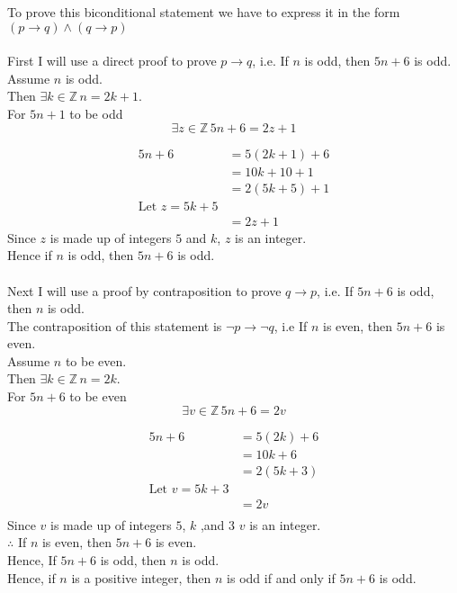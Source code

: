 \documentclass[12pt letter]{report}
\begin{document}
\begin{myproof}
  To prove this biconditional statement we have to express it in the form $\left( p \to q \right) \wedge \left( q \to
    p\right)  $\\
  \\
  First I will use a direct proof to prove $p \to q$, i.e. If $n$ is odd, then $5n + 6$ is odd. \\
  Assume $n$ is odd. \\
  Then $\exists k \in \mathbb{Z} \, n = 2k+ 1$. \\
  For $5n + 1$ to be odd
  \[
    \exists z \in \mathbb{Z} \, 5n + 6 = 2z + 1
  \]

  \begin{align*}
    5n + 6 & = 5 \left( 2k + 1 \right)  + 6 \\
           & = 10k + 10 + 1                 \\
           & = 2 \left( 5k + 5 \right)  + 1 \\
    \text{Let } z = 5k + 5                  \\
           & = 2z + 1
  \end{align*}
  Since $z$ is made up of integers $5$ and $k$, $z$ is an integer.\\
  Hence if $n$ is odd, then  $5n + 6$ is odd.\\
  \\

  \noindent Next I will use a proof by contraposition to prove $q \to p$, i.e. If $5n + 6$ is odd, then $n$ is odd.\\
  The contraposition of this statement is $\neg p \to \neg q $, i.e If $n$ is even, then $5n + 6$ is even.\\
  Assume $n$ to be even.\\
  Then $\exists k \in \mathbb{Z}\, n = 2k$.\\
  For $5n + 6$ to be even
  \[
    \exists v \in \mathbb{Z} \, 5n + 6 = 2v
  \]

  \begin{align*}
    5n + 6 & = 5 \left( 2k \right)  + 6 \\
           & = 10k + 6                  \\
           & = 2 \left( 5k + 3 \right)  \\
    \text{Let }v = 5k + 3               \\
           & = 2v                       \\
  \end{align*}
  Since $v$ is made up of integers $5$, $k$ ,and $3$ $v$ is an integer.\\
  $\therefore$ If $n$ is even, then $5n + 6$ is even.\\
  Hence, If $5n + 6$ is odd, then $n$ is odd.
  \\
  Hence, if $n$ is a positive integer, then $n$ is odd if and only if $5n + 6$ is odd.


\end{myproof}
\end{document}
